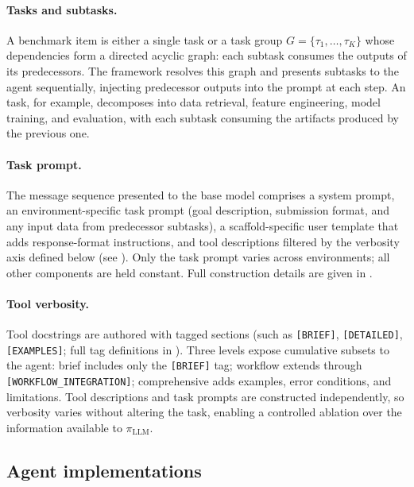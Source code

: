   \paragraph{Tasks and subtasks.}
  A benchmark item is either a single task or a task group $G = \{\tau_1, \ldots, \tau_K\}$ whose dependencies form a directed acyclic graph: each subtask consumes the outputs of its predecessors. The framework resolves this graph and presents subtasks to the agent sequentially, injecting predecessor outputs into the prompt at each step. An \ml task, for example, decomposes into data retrieval, feature engineering, model training, and evaluation, with each subtask consuming the artifacts produced by the previous one.

  
\paragraph{Task prompt.}
\label{sec:task-prompt}

The message sequence presented to the base model comprises a system prompt, an environment-specific task prompt (goal description, submission format, and any input data from predecessor subtasks), a scaffold-specific user template that adds response-format instructions, and tool descriptions filtered by the verbosity axis defined below (see ). Only the task prompt varies across environments; all other components are held constant. Full construction details are given in .


\paragraph{Tool verbosity.}
\label{sec:tool-verbosity}

Tool docstrings are authored with tagged sections (such as \texttt{[BRIEF]}, \texttt{[DETAILED]}, \texttt{[EXAMPLES]}; full tag definitions in ). Three levels expose cumulative subsets to the agent: brief includes only the \texttt{[BRIEF]} tag; workflow extends through \texttt{[WORKFLOW\_INTEGRATION]}; comprehensive adds examples, error conditions, and limitations. Tool descriptions and task prompts are constructed independently, so verbosity varies without altering the task, enabling a controlled ablation over the information available to $\pi_{\text{LLM}}$.


\subsection{Agent implementations} \label{sec:agents-implementations}


